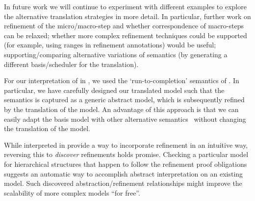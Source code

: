 In future work we will continue to experiment with different examples to explore the alternative translation strategies in more detail. 
In particular, further work on refinement of the micro/macro-step and whether correspondence of macro-steps can be relaxed; whether more complex refinement techniques could be supported (for example, using ranges in refinement annotations) would be useful; supporting/comparing alternative variations of semantics (by generating a different basis/scheduler for the translation).

For our interpretation of \statecharts in \iUMLB, we used the `run-to-completion' semantics of \statecharts.  In particular, we have carefully designed our translated model such that the semantics is captured as a generic abstract model, which is subsequently refined by the translation of the \SCXML model.  An advantage of this approach is that we can easily adapt the basis model with other alternative semantics~\mbox{\cite{Eshuis_2009}} without changing the translation of the \SCXML model. 

While \statecharts interpreted in \iUMLB provide a way to incorporate refinement in an intuitive way, reversing this to \emph{discover} refinements holds promise. 
Checking a particular \statechart model for hierarchical structures that happen to follow the refinement proof obligations suggests an automatic way to accomplish abstract interpretation on an existing model.  
Such discovered abstraction/refinement relationships might improve the scalability of more complex \statechart models ``for free''.
